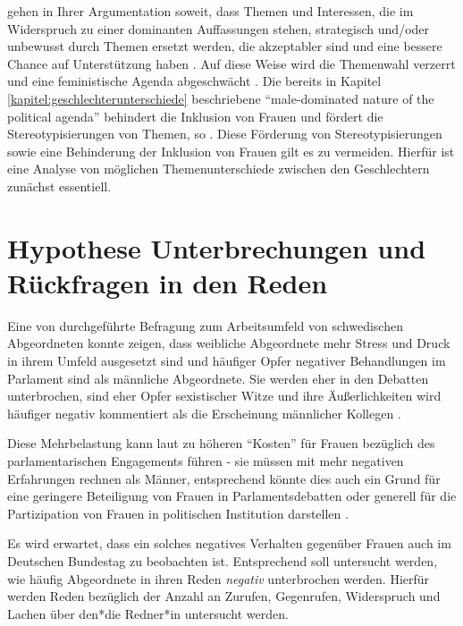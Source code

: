 \documentclass[12pt, 
    twoside=false, 
    bibliography=totoc, 
    numbers=endperiod, 
    headings=normal, 
    toc=chapterentrydotfill
    ]{scrbook}
\begin{document}
\textcite{celis_2018} gehen in Ihrer Argumentation soweit, dass Themen und Interessen, die im Widerspruch zu einer dominanten Auffassungen stehen, strategisch und/oder unbewusst durch Themen ersetzt werden, die akzeptabler sind und eine bessere Chance auf Unterstützung haben \parencites[151]{celis_2018}{swers_2002}. 
Auf diese Weise wird die Themenwahl verzerrt und eine feministische Agenda abgeschwächt \parencite[151]{celis_2018}. Die bereits in Kapitel \ref{kapitel:geschlechterunterschiede} beschriebene \enquote{male-dominated nature of the political agenda} \parencite[151]{celis_2018} behindert die Inklusion von Frauen und fördert die Stereotypisierungen von Themen, so \textcite{celis_2018}.
Diese Förderung von Stereotypisierungen sowie eine Behinderung der Inklusion von Frauen gilt es zu vermeiden. Hierfür ist eine Analyse von möglichen Themenunterschiede zwischen den Geschlechtern zunächst essentiell. 

\section{Hypothese Unterbrechungen und Rückfragen in den Reden}

Eine von \textcite{erikson_2018} durchgeführte Befragung zum Arbeitsumfeld von schwedischen Abgeordneten konnte zeigen, dass weibliche Abgeordnete mehr Stress und Druck in ihrem Umfeld ausgesetzt sind und häufiger Opfer negativer Behandlungen im Parlament sind als männliche Abgeordnete. Sie werden eher in den Debatten unterbrochen, sind eher Opfer sexistischer Witze und ihre Äußerlichkeiten wird häufiger negativ kommentiert als die Erscheinung männlicher Kollegen \parencite[13]{erikson_2018}.

Diese Mehrbelastung kann laut \textcite{erikson_2018} zu höheren \enquote{Kosten} für Frauen bezüglich des parlamentarischen Engagements führen - sie müssen mit mehr negativen Erfahrungen rechnen als Männer, entsprechend könnte dies auch ein Grund für eine geringere Beteiligung von Frauen in Parlamentsdebatten oder generell für die Partizipation von Frauen in politischen Institution darstellen \parencites[vgl.][]{erikson_2018}[vgl.][]{back_2014}.

Es wird erwartet, dass ein solches negatives Verhalten gegenüber Frauen auch im Deutschen Bundestag zu beobachten ist. Entsprechend soll untersucht werden, wie häufig Abgeordnete in ihren Reden \emph{negativ} unterbrochen werden. Hierfür werden Reden bezüglich der Anzahl an Zurufen, Gegenrufen, Widerspruch und Lachen über den*die Redner*in untersucht werden.
\end{document}
